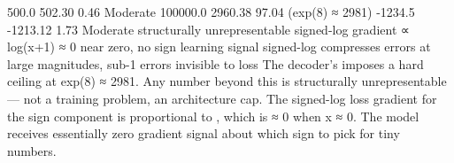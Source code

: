 {}\markdownRendererPipe{} 500.0 \markdownRendererPipe{} 502.30 \markdownRendererPipe{} 0.46\markdownRendererPercentSign{} \markdownRendererPipe{} Moderate \markdownRendererPipe{}\markdownRendererSoftLineBreak
{}\markdownRendererPipe{} 100000.0 \markdownRendererPipe{} 2960.38 \markdownRendererPipe{} 97.04\markdownRendererPercentSign{} \markdownRendererPipe{}  (exp(8) ≈ 2981) \markdownRendererPipe{}\markdownRendererSoftLineBreak
{}\markdownRendererPipe{} -1234.5 \markdownRendererPipe{} -1213.12 \markdownRendererPipe{} 1.73\markdownRendererPercentSign{} \markdownRendererPipe{} Moderate \markdownRendererPipe{}\markdownRendererParagraphSeparator
{}\markdownRendererInterblockSeparator
{}\markdownRendererOlBeginTight
{} structurally unrepresentable\markdownRendererOlItemEnd 
{} signed-log gradient ∝ log(\markdownRendererPipe{}x\markdownRendererPipe{}+1) ≈ 0 near zero, no sign learning signal\markdownRendererOlItemEnd 
{} signed-log compresses errors at large magnitudes, sub-1\markdownRendererPercentSign{} errors invisible to loss\markdownRendererOlItemEnd 
\markdownRendererOlEndTight \markdownRendererInterblockSeparator
{}\markdownRendererThematicBreak{}\markdownRendererInterblockSeparator
{}
\markdownRendererSectionEnd 
\markdownRendererSectionEnd \markdownRendererSectionBegin
{}\markdownRendererInterblockSeparator
{}\markdownRendererSectionBegin
{}\markdownRendererInterblockSeparator
{} The decoder's  imposes a hard ceiling at exp(8) ≈ 2981. Any number beyond this is structurally unrepresentable — not a training problem, an architecture cap.\markdownRendererParagraphSeparator
{} The signed-log loss gradient for the sign component is proportional to , which is ≈ 0 when \markdownRendererPipe{}x\markdownRendererPipe{} ≈ 0. The model receives essentially zero gradient signal about which sign to pick for tiny numbers.\markdownRendererParagraphSeparator
